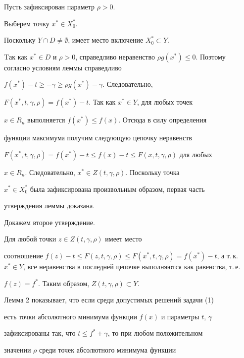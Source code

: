 \begin{pf}


Пусть зафиксирован параметр $\rho>0$.


Выберем точку $x^*\in X_0^*$.


Поскольку $Y\cap D\ne\emptyset$, имеет место включение $X_0^*\subset Y$.


Tак как $x^*\in D$ и $\rho>0$, справедливо неравенство $\rho


g(x^*)\le 0$. Поэтому согласно условиям леммы справедливо


$f(x^*)-t\ge-\gamma\ge \rho g(x^*)-\gamma$. Следовательно,


$F(x^*,t,\gamma,\rho)=f(x^*)-t$. Так как $x^*\in Y$, для любых точек


$x\in R_n$ выполняется $f(x^*)\le f(x)$. Отсюда в силу определения


функции максимума получим следующую цепочку неравенств


$F(x^*,t,\gamma,\rho)=f(x^*)-t\le f(x)-t\le F(x,t,\gamma,\rho)$ для любых


$x\in R_n$. Следовательно, $x^*\in Z(t,\gamma,\rho)$. Поскольку точка


$x^*\in X_0^*$ была зафиксирована произвольным образом, первая часть


утверждения леммы доказана.





Докажем второе утверждение.


Для любой точки $z\in Z(t,\gamma,\rho)$ имеет место 


соотношение $f(z)-t\le


F(z,t,\gamma,\rho)\le F(x^*,t,\gamma,\rho)=f(x^*)-t$, а т.\,к. $x^*\in


Y$, все неравенства в последней цепочке выполняются как равенства, т.\,е.


$f(z)=f^*$. Таким образом, $Z(t,\gamma,\rho)\subset Y$.


\end{pf}





Лемма 2 показывает, что если среди допустимых решений задачи (1)


есть точки абсолютного минимума функции $f(x)$ и параметры $t$, $\gamma$


зафиксированы так, что $t\le f^*+\gamma$, то при любом положительном


значении $\rho$ среди точек абсолютного минимума функции


